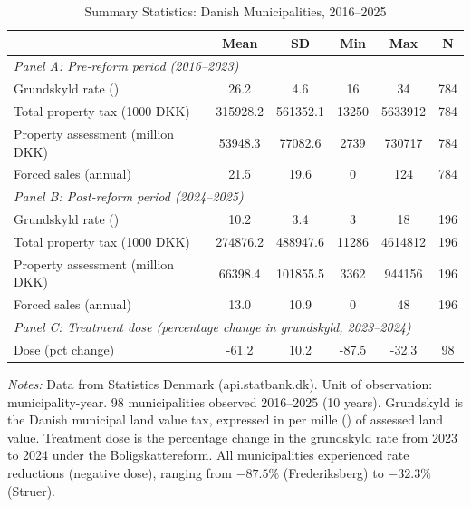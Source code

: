 \begin{table}[t]\begin{threeparttable}
\centering
\caption{Summary Statistics: Danish Municipalities, 2016--2025}
\label{tab:summary}
\small
\begin{tabular}{lccccc}
\toprule
  & Mean & SD & Min & Max & N \\
\midrule
\multicolumn{6}{l}{\textit{Panel A: Pre-reform period (2016--2023)}} \\[3pt]
  Grundskyld rate (\textperthousand{}) & 26.2 & 4.6 & 16 & 34 & 784
 \\
  Total property tax (1000 DKK) & 315928.2 & 561352.1 & 13250 & 5633912 & 784
 \\
  Property assessment (million DKK) & 53948.3 & 77082.6 & 2739 & 730717 & 784
 \\
  Forced sales (annual) & 21.5 & 19.6 & 0 & 124 & 784
 \\[6pt]
\multicolumn{6}{l}{\textit{Panel B: Post-reform period (2024--2025)}} \\[3pt]
  Grundskyld rate (\textperthousand{}) & 10.2 & 3.4 & 3 & 18 & 196
 \\
  Total property tax (1000 DKK) & 274876.2 & 488947.6 & 11286 & 4614812 & 196
 \\
  Property assessment (million DKK) & 66398.4 & 101855.5 & 3362 & 944156 & 196
 \\
  Forced sales (annual) & 13.0 & 10.9 & 0 & 48 & 196
 \\[6pt]
\multicolumn{6}{l}{\textit{Panel C: Treatment dose (percentage change in grundskyld, 2023--2024)}} \\[3pt]
  Dose (pct change) & -61.2 & 10.2 & -87.5 & -32.3 & 98 \\
\bottomrule
\end{tabular}
\begin{tablenotes}
\item \textit{Notes:} Data from Statistics Denmark (api.statbank.dk). Unit of observation: municipality-year. 98 municipalities observed 2016--2025 (10 years). Grundskyld is the Danish municipal land value tax, expressed in per mille (\textperthousand{}) of assessed land value. Treatment dose is the percentage change in the grundskyld rate from 2023 to 2024 under the Boligskattereform. All municipalities experienced rate reductions (negative dose), ranging from $-87.5\%$ (Frederiksberg) to $-32.3\%$ (Struer).
\end{tablenotes}
\end{threeparttable}\end{table}
